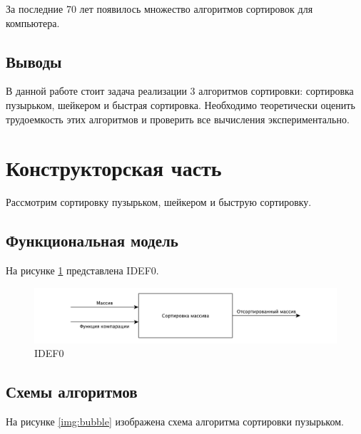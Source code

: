 \documentclass[a4paper,12pt]{article}
\begin{document}
За последние 70 лет появилось множество алгоритмов сортировок для компьютера.\cite{knuth}

\subsection{Выводы}

В данной работе стоит задача реализации 3 алгоритмов сортировки: сортировка пузырьком,
шейкером и быстрая сортировка. Необходимо теоретически оценить трудоемкость этих алгоритмов
и проверить все вычисления экспериментально.

\newpage
\section{Конструкторская часть}

Рассмотрим сортировку пузырьком, шейкером и быструю сортировку.

\subsection{Функциональная модель}

На рисунке \ref{img:IDEF0} представлена IDEF0.

\begin{figure}[H]
    \centering
    \includegraphics[scale=0.5]{IDEF0}
    \caption{IDEF0}
    \label{img:IDEF0}
\end{figure}

\subsection{Схемы алгоритмов}

На рисунке \ref{img:bubble} изображена схема алгоритма сортировки пузырьком.
\end{document}
